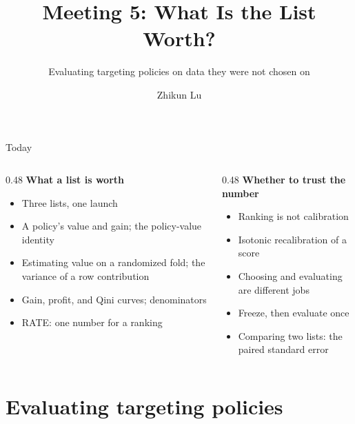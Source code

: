 \documentclass[aspectratio=169, 11pt, handout]{beamer}
\title[Meeting 5]{Meeting 5: What Is the List Worth?}
\subtitle{Evaluating targeting policies on data they were not chosen on}
\author{Zhikun Lu}
\date{}
\begin{document}
\begin{frame}
\titlepage
\end{frame}

\begin{frame}{Today}

\begin{columns}[T]
\begin{column}{0.48\textwidth}
\textbf{What a list is worth}
\begin{itemize}
  \item Three lists, one launch
  \item A policy's value and gain; the policy-value identity
  \item Estimating value on a randomized fold; the variance of a row contribution
  \item Gain, profit, and Qini curves; denominators
  \item RATE: one number for a ranking
\end{itemize}
\end{column}
\begin{column}{0.48\textwidth}
\textbf{Whether to trust the number}
\begin{itemize}
  \item Ranking is not calibration
  \item Isotonic recalibration of a score
  \item Choosing and evaluating are different jobs
  \item Freeze, then evaluate once
  \item Comparing two lists: the paired standard error
\end{itemize}
\end{column}
\end{columns}
\end{frame}

\section{Evaluating targeting policies}
\end{document}

